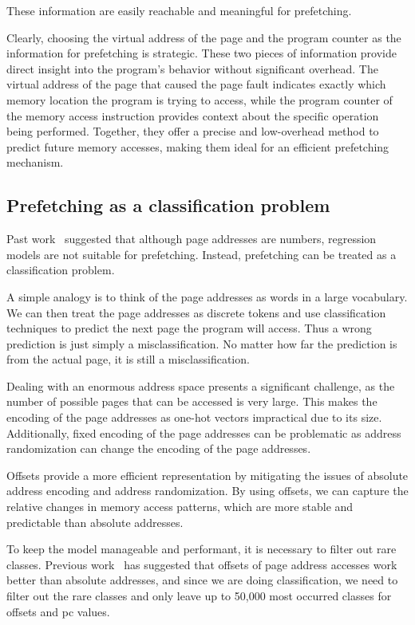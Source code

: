 These information are easily reachable and meaningful for prefetching.

Clearly, choosing the virtual address of the page and the program counter as the information for prefetching is strategic. These two pieces of information provide direct insight into the program's behavior without significant overhead. The virtual address of the page that caused the page fault indicates exactly which memory location the program is trying to access, while the program counter of the memory access instruction provides context about the specific operation being performed. Together, they offer a precise and low-overhead method to predict future memory accesses, making them ideal for an efficient prefetching mechanism.

\subsection{Prefetching as a classification problem}

Past work~\cite{LMAP} suggested that although page addresses are numbers, regression models are not suitable for prefetching. Instead, prefetching can be treated as a classification problem.

A simple analogy is to think of the page addresses as words in a large vocabulary. We can then treat the page addresses as discrete tokens and use classification techniques to predict the next page the program will access. Thus a wrong prediction is just simply a misclassification. No matter how far the prediction is from the actual page, it is still a misclassification.

Dealing with an enormous address space presents a significant challenge, as the number of possible pages that can be accessed is very large. This makes the encoding of the page addresses as one-hot vectors impractical due to its size. Additionally, fixed encoding of the page addresses can be problematic as address randomization can change the encoding of the page addresses.

Offsets provide a more efficient representation by mitigating the issues of absolute address encoding and address randomization. By using offsets, we can capture the relative changes in memory access patterns, which are more stable and predictable than absolute addresses.

To keep the model manageable and performant, it is necessary to filter out rare classes. Previous work~\cite{LMAP} has suggested that offsets of page address accesses work better than absolute addresses, and since we are doing classification, we need to filter out the rare classes and only leave up to 50,000 most occurred classes for offsets and pc values.


